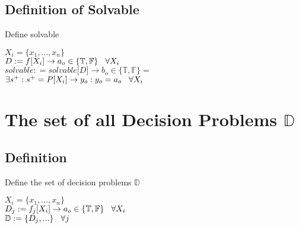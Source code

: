\documentclass[11pt]{article}
\begin{document}
\subsection{Definition of Solvable}
Define solvable
\begin{center}
$
X_i = \{x_1,...,x_n\}
$
\\ \vspace{2mm}
$
D := f \lbrack X_i \rbrack \rightarrow a_{o} \in \{\mathbb{T}, \mathbb{F}\} \hspace{3mm} \forall X_i
$
\\ \vspace{2mm}
$solvable : = solvable \lbrack D \rbrack \rightarrow b_o \in \{ \mathbb{T}, \mathbb{F} \} =$
\\ \vspace{2mm}
$\exists s^+ : s^+ = P \lbrack X_i \rbrack \rightarrow y_{o} : y_o = a_{o} \hspace{3mm} \forall X_i$
\end{center}





\section{The set of all Decision Problems $\mathbb{D}$}

\subsection{Definition}
Define the set of decision problems $\mathbb{D}$
\begin{center}
$
X_i = \{x_1,...,x_n\}
$
\\ \vspace{2mm}
$
D_j := f_j \lbrack X_i \rbrack \rightarrow a_{o} \in \{\mathbb{T}, \mathbb{F}\} \hspace{3mm} \forall X_i
$
\\ \vspace{2mm}
$\mathbb{D} := \{D_j,...\} \hspace{3mm} \forall j$
\end{center}





\end{document}
